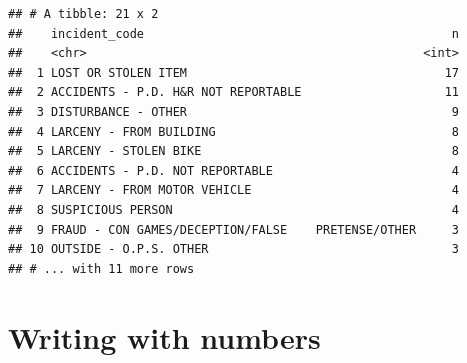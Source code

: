 \documentclass[]{book}
\newenvironment{Shaded}{\begin{snugshade}}{\end{snugshade}}
\newcommand{\DataTypeTok}[1]{\textcolor[rgb]{0.13,0.29,0.53}{#1}}
\newcommand{\DecValTok}[1]{\textcolor[rgb]{0.00,0.00,0.81}{#1}}
\newcommand{\KeywordTok}[1]{\textcolor[rgb]{0.13,0.29,0.53}{\textbf{#1}}}
\newcommand{\NormalTok}[1]{#1}
\newcommand{\OperatorTok}[1]{\textcolor[rgb]{0.81,0.36,0.00}{\textbf{#1}}}
\newcommand{\OtherTok}[1]{\textcolor[rgb]{0.56,0.35,0.01}{#1}}
\newcommand{\StringTok}[1]{\textcolor[rgb]{0.31,0.60,0.02}{#1}}
\begin{document}
\begin{Shaded}
\end{Shaded}

\begin{verbatim}
## # A tibble: 21 x 2
##    incident_code                                           n
##    <chr>                                               <int>
##  1 LOST OR STOLEN ITEM                                    17
##  2 ACCIDENTS - P.D. H&R NOT REPORTABLE                    11
##  3 DISTURBANCE - OTHER                                     9
##  4 LARCENY - FROM BUILDING                                 8
##  5 LARCENY - STOLEN BIKE                                   8
##  6 ACCIDENTS - P.D. NOT REPORTABLE                         4
##  7 LARCENY - FROM MOTOR VEHICLE                            4
##  8 SUSPICIOUS PERSON                                       4
##  9 FRAUD - CON GAMES/DECEPTION/FALSE    PRETENSE/OTHER     3
## 10 OUTSIDE - O.P.S. OTHER                                  3
## # ... with 11 more rows
\end{verbatim}

\hypertarget{writing-with-numbers}{%
\chapter{Writing with numbers}\label{writing-with-numbers}}
\end{document}
